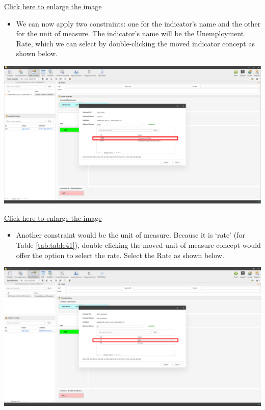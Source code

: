 \documentclass[
]{book}
\providecommand{\tightlist}{%
  \setlength{\itemsep}{0pt}\setlength{\parskip}{0pt}}
\begin{document}
\href{images/image136.png}{Click here to enlarge the image}

\begin{itemize}
\tightlist
\item
  We can now apply two constraints: one for the indicator's name and the other for the unit of measure. The indicator's name will be the Unemployment Rate, which we can select by double-clicking the moved indicator concept as shown below.
\end{itemize}

\begin{center}\includegraphics[width=1\linewidth]{./images/image138} \end{center}

\href{images/image138.png}{Click here to enlarge the image}

\begin{itemize}
\tightlist
\item
  Another constraint would be the unit of measure. Because it is `rate' (for Table \ref{tab:table41}), double-clicking the moved unit of measure concept would offer the option to select the rate. Select the Rate as shown below.
\end{itemize}

\begin{center}\includegraphics[width=1\linewidth]{./images/image140} \end{center}
\end{document}
